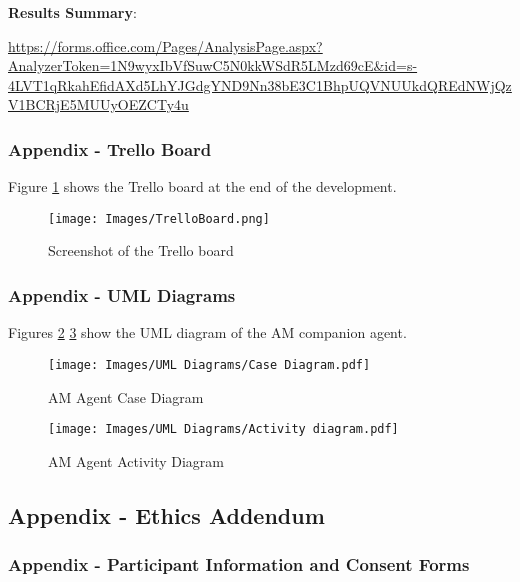 \documentclass{IEEEtran}
\begin{document}
\textbf{Results Summary}:

\url{https://forms.office.com/Pages/AnalysisPage.aspx?AnalyzerToken=1N9wyxIbVfSuwC5N0kkWSdR5LMzd69cE&id=s-4LVT1qRkahEfidAXd5LhYJGdgYND9Nn38bE3C1BhpUQVNUUkdQREdNWjQzV1BCRjE5MUUyOEZCTy4u}

\subsubsection{Appendix - Trello Board}
\label{AppendixTrelloBoard}

Figure \ref{fig:AppendixTrelloBoard} shows the Trello board at the end of the development.

\begin{figure}[!h]
  \centering
  \texttt{[image: Images/TrelloBoard.png]}
  
\caption{Screenshot of the Trello board}
\label{fig:AppendixTrelloBoard}
\end{figure}

\clearpage

\subsubsection{Appendix - UML Diagrams}
\label{AppendixUML}

Figures \ref{fig:AppendixCaseUML} \ref{fig:AppendixActivityUML} show the UML diagram of the AM companion agent.

\begin{figure}[!h]
  \centering
  \texttt{[image: Images/UML Diagrams/Case Diagram.pdf]}
  
\caption{AM Agent Case Diagram}
\label{fig:AppendixCaseUML}
\end{figure}

\begin{figure}[!h]
  \centering
  \texttt{[image: Images/UML Diagrams/Activity diagram.pdf]}
  
\caption{AM Agent Activity Diagram}
\label{fig:AppendixActivityUML}
\end{figure}

\clearpage


\subsection{Appendix - Ethics Addendum}
\label{AppendixEthics}

\subsubsection{Appendix - Participant Information and Consent Forms}
\label{AppendixEthicsForms}
\end{document}
